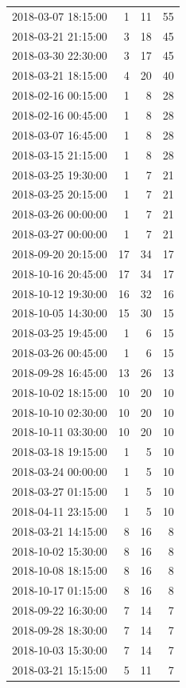 \begin{tabular}{lrrr}
2018-03-07 18:15:00 & 1 & 11 & 55 \\
2018-03-21 21:15:00 & 3 & 18 & 45 \\
2018-03-30 22:30:00 & 3 & 17 & 45 \\
2018-03-21 18:15:00 & 4 & 20 & 40 \\
2018-02-16 00:15:00 & 1 & 8 & 28 \\
2018-02-16 00:45:00 & 1 & 8 & 28 \\
2018-03-07 16:45:00 & 1 & 8 & 28 \\
2018-03-15 21:15:00 & 1 & 8 & 28 \\
2018-03-25 19:30:00 & 1 & 7 & 21 \\
2018-03-25 20:15:00 & 1 & 7 & 21 \\
2018-03-26 00:00:00 & 1 & 7 & 21 \\
2018-03-27 00:00:00 & 1 & 7 & 21 \\
2018-09-20 20:15:00 & 17 & 34 & 17 \\
2018-10-16 20:45:00 & 17 & 34 & 17 \\
2018-10-12 19:30:00 & 16 & 32 & 16 \\
2018-10-05 14:30:00 & 15 & 30 & 15 \\
2018-03-25 19:45:00 & 1 & 6 & 15 \\
2018-03-26 00:45:00 & 1 & 6 & 15 \\
2018-09-28 16:45:00 & 13 & 26 & 13 \\
2018-10-02 18:15:00 & 10 & 20 & 10 \\
2018-10-10 02:30:00 & 10 & 20 & 10 \\
2018-10-11 03:30:00 & 10 & 20 & 10 \\
2018-03-18 19:15:00 & 1 & 5 & 10 \\
2018-03-24 00:00:00 & 1 & 5 & 10 \\
2018-03-27 01:15:00 & 1 & 5 & 10 \\
2018-04-11 23:15:00 & 1 & 5 & 10 \\
2018-03-21 14:15:00 & 8 & 16 & 8 \\
2018-10-02 15:30:00 & 8 & 16 & 8 \\
2018-10-08 18:15:00 & 8 & 16 & 8 \\
2018-10-17 01:15:00 & 8 & 16 & 8 \\
2018-09-22 16:30:00 & 7 & 14 & 7 \\
2018-09-28 18:30:00 & 7 & 14 & 7 \\
2018-10-03 15:30:00 & 7 & 14 & 7 \\
2018-03-21 15:15:00 & 5 & 11 & 7 \\

\end{tabular}
